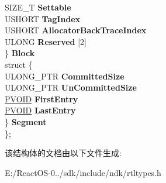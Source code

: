 \begin{DoxyCompactItemize}
\begin{tabbing}
\>\>SIZE\_T {\bfseries Settable}\\
\>\>USHORT {\bfseries TagIndex}\\
\>\>USHORT {\bfseries AllocatorBackTraceIndex}\\
\>\>ULONG {\bfseries Reserved} \mbox{[}2\mbox{]}\\
\>\} {\bfseries Block}\\
\>struct \{\\
\>\>ULONG\_PTR {\bfseries CommittedSize}\\
\>\>ULONG\_PTR {\bfseries UnCommittedSize}\\
\>\>\hyperlink{interfacevoid}{PVOID} {\bfseries FirstEntry}\\
\>\>\hyperlink{interfacevoid}{PVOID} {\bfseries LastEntry}\\
\>\} {\bfseries Segment}\\
\}; \\

\end{tabbing}\end{DoxyCompactItemize}


该结构体的文档由以下文件生成\+:\begin{DoxyCompactItemize}
\item 
E\+:/\+React\+O\+S-\/0../sdk/include/ndk/rtltypes.\+h\end{DoxyCompactItemize}
